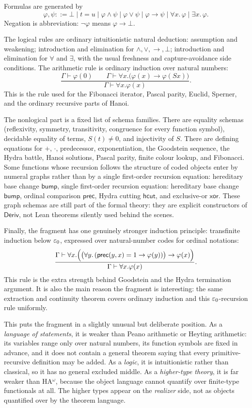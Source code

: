 \documentclass[11pt]{article}
\begin{document}
Formulas are generated by
\[
  \varphi,\psi ::= \bot \mid t=u \mid
  \varphi\land\psi \mid \varphi\lor\psi \mid
  \varphi\to\psi \mid \forall x.\,\varphi \mid \exists x.\,\varphi .
\]
Negation is abbreviation: $\neg\varphi$ means $\varphi\to\bot$.

The logical rules are ordinary intuitionistic natural deduction: assumption
and weakening; introduction and elimination for $\land,\lor,\to,\bot$;
introduction and elimination for $\forall$ and $\exists$, with the usual
freshness and capture-avoidance side conditions. The arithmetic rule is
ordinary induction over natural numbers:
\[
  \frac{\Gamma\vdash \varphi(0)
        \qquad
        \Gamma\vdash \forall x.\bigl(\varphi(x)\to\varphi(Sx)\bigr)}
       {\Gamma\vdash \forall x.\varphi(x)}.
\]
This is the rule used for the Fibonacci iterator, Pascal parity, Euclid,
Sperner, and the ordinary recursive parts of Hanoi.

The nonlogical part is a fixed list of schema families. There are equality
schemas (reflexivity, symmetry, transitivity, congruence for every function
symbol), decidable equality of terms, $S(t)\neq 0$, and injectivity of $S$.
There are defining equations for $+$, $\cdot$, predecessor, exponentiation,
the Goodstein sequence, the Hydra battle, Hanoi solutions, Pascal parity,
finite colour lookup, and Fibonacci. Some functions whose recursion follows
the structure of coded objects enter by numeral graphs rather than by a
single first-order recursion equation: hereditary base change $\mathsf{bump}$,
single first-order recursion equation: hereditary base change $\mathsf{bump}$,
ordinal comparison $\mathsf{prec}$, Hydra cutting $\mathsf{hcut}$, and
exclusive-or $\mathsf{xor}$.
These graph schemas are still part of the formal theory: they are explicit
constructors of $\mathsf{Deriv}$, not Lean theorems silently used behind the
scenes.

Finally, the fragment has one genuinely stronger induction principle:
transfinite induction below $\varepsilon_0$, expressed over natural-number codes for
ordinal notations:
\[
  \frac{
    \Gamma\vdash
    \forall x.\Bigl(
      \bigl(\forall y.\,(\mathsf{prec}(y,x)=1\to\varphi(y))\bigr)\to\varphi(x)
    \Bigr)}
  {\Gamma\vdash \forall x.\varphi(x)}.
\]
This rule is the extra strength behind Goodstein and the Hydra termination
argument. It is also the main reason the fragment is interesting: the same
extraction and continuity theorem covers ordinary induction and this
$\varepsilon_0$-recursion rule uniformly.

This puts the fragment in a slightly unusual but deliberate position. As a
\emph{language of statements}, it is weaker than Peano arithmetic or Heyting
arithmetic: its variables range only over natural numbers, its function
symbols are fixed in advance, and it does not contain a general theorem
saying that every primitive-recursive definition may be added. As a
\emph{logic}, it is intuitionistic rather than classical, so it has no
general excluded middle. As a \emph{higher-type theory}, it is far weaker
than HA$^\omega$, because the object language cannot quantify over
finite-type functionals at all. The higher types appear on the
\emph{realizer} side, not as objects quantified over by the theorem language.
\end{document}
